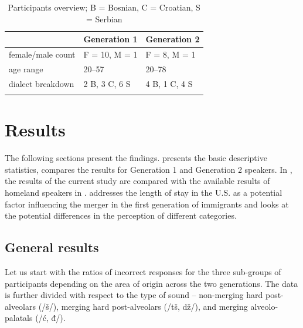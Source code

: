 \documentclass[output=paper,modfonts,newtxmath,hidelinks,]{langscibook}
\begin{document}
\begin{table}
\begin{tabularx}{\textwidth}{XXl}
\lsptoprule
&  \textbf{Generation 1} &  \textbf{Generation 2}\\
\midrule
female/male count & F = 10, M = 1 & F = 8, M = 1\\
age range & 20--57 & 20--78\\
dialect breakdown & 2 B, 3 C, 6 S & 4 B, 1 C, 4 S\\
\lspbottomrule
\end{tabularx}
\caption{\label{tab:mihajlovic:4} Participants overview; B = Bosnian, C = Croatian, S = Serbian}
\end{table}

\section{Results}\label{sec:mihajlovic:5}

The following sections present the findings.  presents the basic descriptive statistics,  compares the results for Generation 1 and Generation 2 speakers. In , the results of the current study are compared with the available results of homeland speakers in \citet{Cavar-Hamann2011}.  addresses the length of stay in the U.S. as a potential factor influencing the merger in the first generation of immigrants and  looks at the potential differences in the perception of different categories.


\subsection{General results}\label{sec:mihajlovic:5.1}

Let us start with the ratios of incorrect responses for the three sub-groups of participants depending on the area of origin across the two generations. The data is further divided with respect to the type of sound – non-merging hard post-alveolars (/š/), merging hard post-alveolars (/tš, dž/), and merging alveolo-palatals (/ć, đ/).
\end{document}
